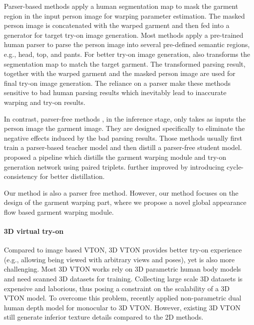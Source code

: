 \documentclass[10pt,twocolumn,letterpaper]{article}
\begin{document}
Parser-based methods apply a human segmentation map to mask the garment region in the input person image for warping parameter estimation. The masked person image is concatenated with the warped garment and then fed into a generator for target try-on image generation. Most methods \cite{han2018viton,wang2018toward,yu2019vtnfp,han2019clothflow,yang2020towards,ge2021disentangled} apply a pre-trained human parser \cite{gong2017look} to parse the person image into several pre-defined semantic regions, e.g., head, top, and pants. For better try-on image generation, \cite{yang2020towards} also transforms the segmentation map to  match the target garment. The transformed parsing result, together with the warped garment and the masked person image are used for final try-on image generation. The reliance on a parser make these methods sensitive to bad human parsing results \cite{issenhuth2020not, ge2021parser} which inevitably  lead to inaccurate  warping and try-on results.

In contrast, parser-free methods \cite{issenhuth2020not, ge2021parser}, in the inference stage, only takes as inputs  the person image the garment image. They   are designed specifically to eliminate the negative effects induced by the bad parsing results. Those methods usually first train a parser-based teacher model and then distill a parser-free student model. \cite{issenhuth2020not} proposed a pipeline which distills the garment warping module and try-on generation network using paired triplets. \cite{ge2021parser} further improved \cite{issenhuth2020not} by introducing cycle-consistency for better distillation.

Our method is also a parser free method. However, our method focuses on the design of the garment warping part, where we propose a novel global appearance flow based garment warping module.
\vspace{-0.4cm}

\paragraph{3D virtual try-on} Compared to image based VTON, 3D VTON provides better try-on experience (e.g., allowing being viewed with arbitrary views and poses),  yet is also more challenging. Most 3D VTON works \cite{bhatnagar2019multi, mir2020learning} rely on 3D parametric human body models \cite{loper2015smpl} and need scanned 3D datasets for training.   Collecting large scale 3D datasets is expensive and laborious, thus posing a constraint on the scalability of a 3D VTON model. To overcome this problem, recently \cite{zhao2021m3d} applied non-parametric dual human depth model \cite{gabeur2019moulding} for monocular to 3D VTON. However, existing 3D VTON still generate inferior texture details compared to the 2D methods.  
\end{document}
